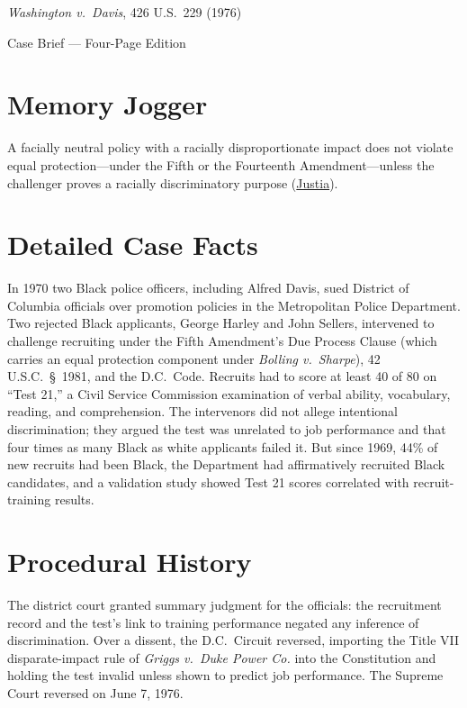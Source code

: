 \documentclass[12pt]{article}
\begin{document}
\begin{center}
{\LARGE \textit{Washington v.\ Davis}, 426 U.S.\ 229 (1976)\par}
\vspace{0.8em}
{\large Case Brief --- Four-Page Edition\par}
\end{center}
\vspace{1em}

\section{Memory Jogger}

A facially neutral policy with a racially disproportionate impact does not violate equal protection---under the Fifth or the Fourteenth Amendment---unless the challenger proves a racially discriminatory purpose (\href{https://supreme.justia.com/cases/federal/us/426/229/}{Justia}).

\section{Detailed Case Facts}

In 1970 two Black police officers, including Alfred Davis, sued District of Columbia officials over promotion policies in the Metropolitan Police Department. Two rejected Black applicants, George Harley and John Sellers, intervened to challenge recruiting under the Fifth Amendment's Due Process Clause (which carries an equal protection component under \textit{Bolling v.\ Sharpe}), 42 U.S.C.\ \S~1981, and the D.C.\ Code. Recruits had to score at least 40 of 80 on ``Test 21,'' a Civil Service Commission examination of verbal ability, vocabulary, reading, and comprehension. The intervenors did not allege intentional discrimination; they argued the test was unrelated to job performance and that four times as many Black as white applicants failed it. But since 1969, 44\% of new recruits had been Black, the Department had affirmatively recruited Black candidates, and a validation study showed Test 21 scores correlated with recruit-training results.

\section{Procedural History}

The district court granted summary judgment for the officials: the recruitment record and the test's link to training performance negated any inference of discrimination. Over a dissent, the D.C.\ Circuit reversed, importing the Title VII disparate-impact rule of \textit{Griggs v.\ Duke Power Co.} into the Constitution and holding the test invalid unless shown to predict job performance. The Supreme Court reversed on June 7, 1976.
\end{document}
